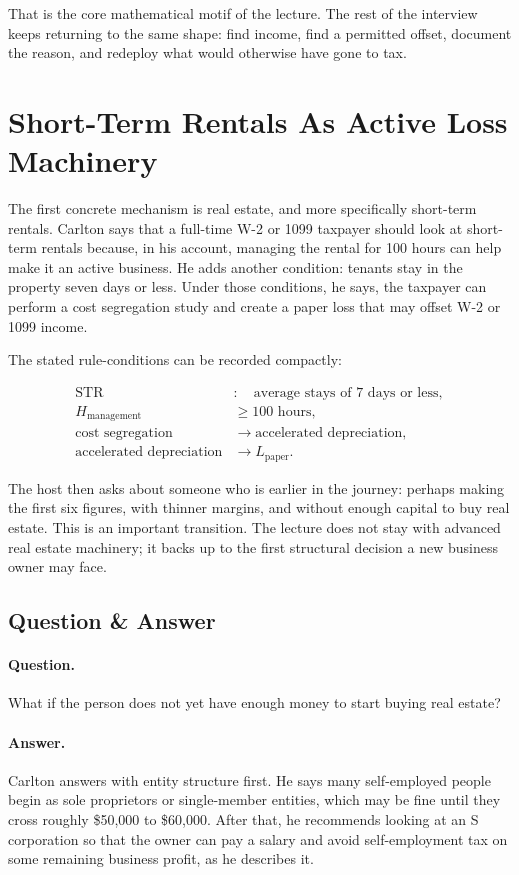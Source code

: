 That is the core mathematical motif of the lecture. The rest of the interview keeps returning to the same shape: find income, find a permitted offset, document the reason, and redeploy what would otherwise have gone to tax.

\section{Short-Term Rentals As Active Loss Machinery}

The first concrete mechanism is real estate, and more specifically short-term rentals. Carlton says that a full-time W-2 or 1099 taxpayer should look at short-term rentals because, in his account, managing the rental for 100 hours can help make it an active business. He adds another condition: tenants stay in the property seven days or less. Under those conditions, he says, the taxpayer can perform a cost segregation study and create a paper loss that may offset W-2 or 1099 income.

The stated rule-conditions can be recorded compactly:

\begin{align}
\mathrm{STR} &:\quad \text{average stays of }7\text{ days or less},\\
H_{\mathrm{management}} &\geq 100\text{ hours},\\
\text{cost segregation} &\longrightarrow \text{accelerated depreciation},\\
\text{accelerated depreciation} &\longrightarrow L_{\mathrm{paper}}.
\end{align}

The host then asks about someone who is earlier in the journey: perhaps making the first six figures, with thinner margins, and without enough capital to buy real estate. This is an important transition. The lecture does not stay with advanced real estate machinery; it backs up to the first structural decision a new business owner may face.

\subsection{Question \& Answer}

\paragraph{Question.}
What if the person does not yet have enough money to start buying real estate?

\paragraph{Answer.}
Carlton answers with entity structure first. He says many self-employed people begin as sole proprietors or single-member entities, which may be fine until they cross roughly \$50,000 to \$60,000. After that, he recommends looking at an S corporation so that the owner can pay a salary and avoid self-employment tax on some remaining business profit, as he describes it.

